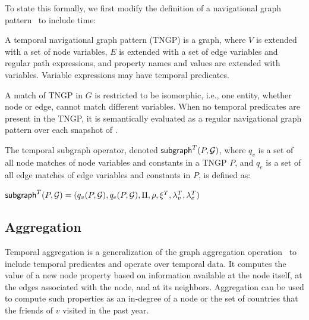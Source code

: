 To state this formally, we first modify the definition of a
navigational graph pattern~\cite{DBLP:journals/corr/AnglesABHRV16} to
include time:

\begin{definition}
\label{def:tngp}
A temporal navigational graph pattern (TNGP) is a graph, where
$V$ is extended with a set of node variables, $E$ is extended with a
set of edge variables and regular path expressions, and property names
and values are extended with variables.  Variable expressions
may have temporal predicates.

A match of TNGP in $G$ is restricted to be isomorphic, i.e., one
entity, whether node or edge, cannot match different variables.
When no temporal predicates are present in the TNGP, it is
  semantically evaluated as a regular navigational graph pattern over
  each snapshot of \ttt.
\end{definition}


\begin{definition}
\label{def:subv}
The temporal subgraph operator, denoted $\textsf{subgraph}^T(P,\mathcal{G})$, where $q_v$
is a set of all node matches of node variables and constants in a TNGP
$P$, and $q_e$ is a set of all edge matches of edge variables and
constants in $P$, is defined as:

$\textsf{subgraph}^T(P,\mathcal{G}) = (q_v(P,\mathcal{G}), q_e(P,\mathcal{G}),\Pi,\rho,\xi^T,\lambda^T_v,\lambda^T_e)$
\end{definition}

\subsection{Aggregation}

Temporal aggregation is a generalization of the graph aggregation
operation~\cite{Wood2012} to include temporal predicates and operate
over temporal data.  It computes the value of a new node property
based on information available at the node itself, at the edges
associated with the node, and at its neighbors.  Aggregation can be
used to compute such properties as an in-degree of a node or the set
of countries that the friends of $v$ visited in the past year.

